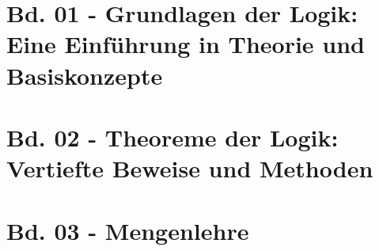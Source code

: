 \documentclass{book}
\newcounter{file}
\theoremstyle{remark}
\begin{document}
\title{}
\author{}
\date{}


\part{Bd. 01 - Grundlagen der Logik: Eine Einführung in Theorie und Basiskonzepte}
 
\part{Bd. 02 - Theoreme der Logik: Vertiefte Beweise und Methoden}
 
\part{Bd. 03 - Mengenlehre}
 
\end{document}
